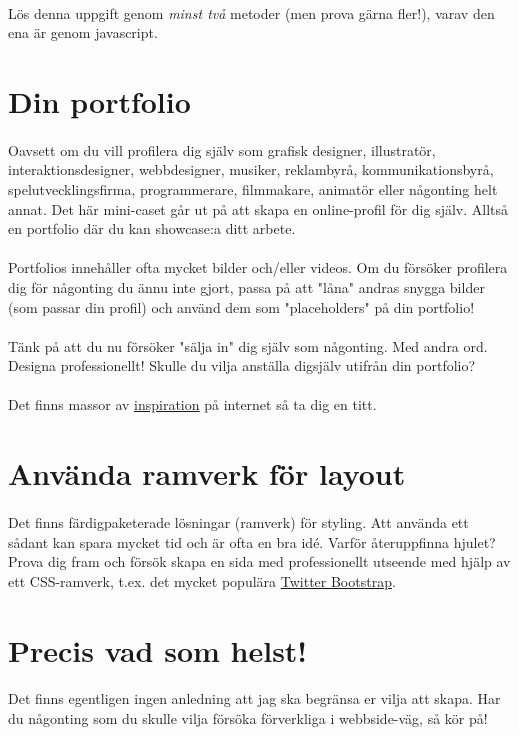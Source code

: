 \documentclass{article}
\begin{document}
    \paragraph{}
      Lös denna uppgift genom \emph{minst två} metoder (men prova gärna fler!), varav den ena är genom javascript.




  \newpage
  \section{ Din portfolio }
    \paragraph{}
    Oavsett om du vill profilera dig själv som grafisk designer, illustratör, interaktionsdesigner, webbdesigner, musiker, reklambyrå, kommunikationsbyrå, spelutvecklingsfirma, programmerare, filmmakare, animatör eller någonting helt annat. Det här mini-caset går ut på att skapa en online-profil för dig själv. Alltså en portfolio där du kan showcase:a ditt arbete.

    \paragraph{}
    Portfolios innehåller ofta mycket bilder och/eller videos. Om du försöker profilera dig för någonting du ännu inte gjort, passa på att "låna" andras snygga bilder (som passar din profil) och använd dem som "placeholders" på din portfolio!

    \paragraph{}
    Tänk på att du nu försöker "sälja in" dig själv som någonting. Med andra ord. Designa professionellt! Skulle du vilja anställa digsjälv utifrån din portfolio?

    \paragraph{}
    Det finns massor av \href{http://www.portfoliobox.net/examples}{inspiration} på internet så ta dig en titt.


  \newpage
  \section{ Använda ramverk för layout }
  \paragraph{}
  Det finns färdigpaketerade lösningar (ramverk) för styling. Att använda ett sådant kan spara mycket tid och är ofta en bra idé. Varför återuppfinna hjulet? Prova dig fram och försök skapa en sida med professionellt utseende med hjälp av ett CSS-ramverk, t.ex. det mycket populära \href{http://getbootstrap.com/}{Twitter Bootstrap}.



  \newpage
  \section{ Precis vad som helst! }
    \paragraph{}
    Det finns egentligen ingen anledning att jag ska begränsa er vilja att skapa. Har du någonting som du skulle vilja försöka förverkliga i webbside-väg, så kör på!
\end{document}
